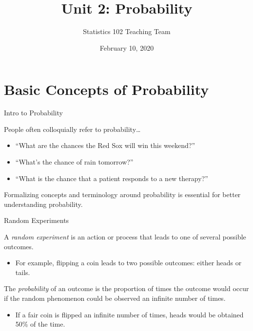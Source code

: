\documentclass[ignorenonframetext,aspectratio=169]{beamer}
\title{Unit 2: Probability}
\author{Statistics 102 Teaching Team}
\date{February 10, 2020}
\providecommand{\tightlist}{%
  \setlength{\itemsep}{0pt}\setlength{\parskip}{0pt}}
\begin{document}
\frame{\titlepage}

\begin{frame}
\tableofcontents[hideallsubsections]
\end{frame}

\section{Basic Concepts of
Probability}\label{basic-concepts-of-probability}

\begin{frame}{Intro to Probability}

People often colloquially refer to probability\ldots{}

\begin{itemize}
\tightlist
\item
  ``What are the chances the Red Sox will win this weekend?''
\item
  ``What's the chance of rain tomorrow?''
\item
  ``What is the chance that a patient responds to a new therapy?''
\end{itemize}

Formalizing concepts and terminology around probability is essential for
better understanding probability.

\end{frame}

\begin{frame}{Random Experiments}

A \emph{random experiment} is an action or process that leads to one of
several possible outcomes.

\begin{itemize}
\tightlist
\item
  For example, flipping a coin leads to two possible outcomes: either
  heads or tails.
\end{itemize}

The \emph{probability} of an outcome is the proportion of times the
outcome would occur if the random phenomenon could be observed an
infinite number of times.

\begin{itemize}
\tightlist
\item
  If a fair coin is flipped an infinite number of times, heads would be
  obtained 50\% of the time.
\end{itemize}

\end{frame}
\end{document}
